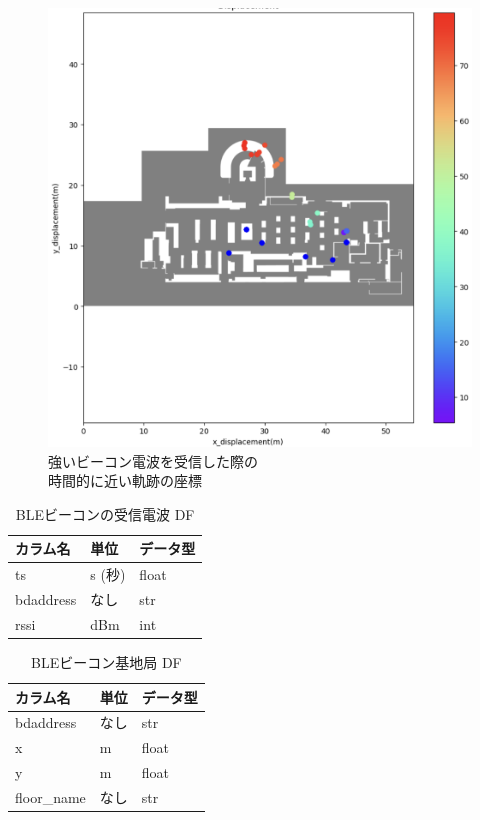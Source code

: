 \begin{figure}[ht]
	\centering
	\includegraphics[width=\linewidth]{image/ble-merge.jpg}
	\caption{強いビーコン電波を受信した際の\\時間的に近い軌跡の座標}    \label{fig:ble-merge}
\end{figure}

\begin{table}[ht]
  \caption{BLEビーコンの受信電波 DF}
	\centering
	\begin{tabular}{lll}
		\toprule
		カラム名      & 単位    & データ型  \\
		\midrule
		ts        & s (秒) & float \\
		bdaddress & なし    & str   \\
		rssi      & dBm   & int   \\
		\bottomrule
	\end{tabular}
\end{table}

\begin{table}[ht]
	\caption{BLEビーコン基地局 DF}
	\centering
	\begin{tabular}{lll}
		\toprule
		カラム名        & 単位 & データ型  \\
		\midrule
		bdaddress   & なし & str   \\
		x           & m  & float \\
		y           & m  & float \\
		floor\_name & なし & str   \\
		\bottomrule
	\end{tabular}
\end{table}
